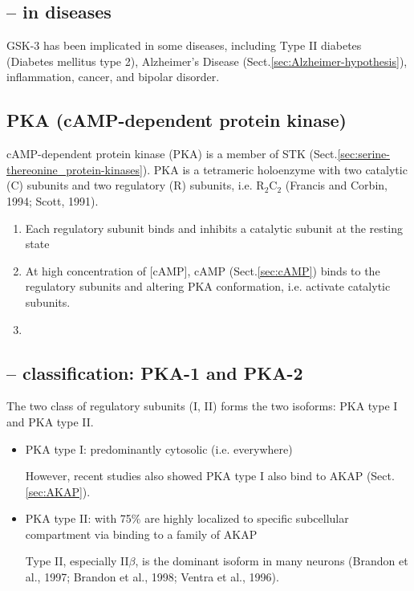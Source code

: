 \subsection{-- in diseases}
\label{sec:GSK3-in-disease}

GSK-3 has been implicated in some diseases, including Type II diabetes (Diabetes
mellitus type 2), Alzheimer's Disease (Sect.\ref{sec:Alzheimer-hypothesis}),
inflammation, cancer, and bipolar disorder.

\subsection{PKA (cAMP-dependent protein kinase)}
\label{sec:PKA}

cAMP-dependent protein kinase (PKA) is a member of STK
(Sect.\ref{sec:serine-thereonine_protein-kinases}).
PKA is a tetrameric holoenzyme with two catalytic (C) subunits and two
regulatory (R) subunits, i.e. R$_2$C$_2$ (Francis and Corbin, 1994; Scott,
1991).
\begin{enumerate}
  \item   Each regulatory subunit binds and inhibits a catalytic subunit at the
  resting state
  
  \item At high concentration of [cAMP], cAMP (Sect.\ref{sec:cAMP}) binds to the
  regulatory subunits and altering PKA conformation, i.e. activate catalytic
  subunits.

  \item 
\end{enumerate}


\subsection{-- classification: PKA-1 and PKA-2}
\label{sec:PKA-classification}

The two class of regulatory subunits (I, II) forms the two isoforms: PKA type I
and PKA type II.
\begin{itemize}

  \item PKA type I: predominantly cytosolic (i.e. everywhere)

However, recent studies also showed PKA type I also bind to AKAP
(Sect.\ref{sec:AKAP}). 

  \item PKA type II: with 75\% are highly localized to specific
  subcellular compartment via binding to a family of AKAP \citep{rubin1994} 
  
  Type II, especially II$\beta$, is the dominant isoform in many neurons
  (Brandon et al., 1997; Brandon et al., 1998; Ventra et al., 1996).
  
\end{itemize}


